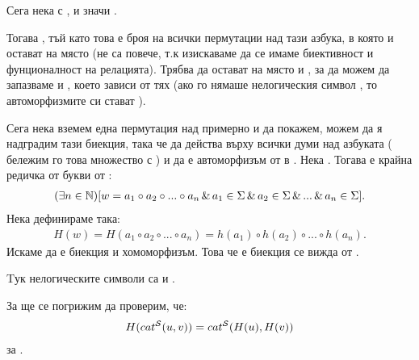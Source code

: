 \documentclass[12pt]{article}
\begin{document}
Сега нека с ,  и значи .

Тогава , тъй като това е броя на всички пермутации над тази азбука, в която  и  остават на място (не са повече, т.к изискаваме да се имаме биективност и фунционалност на релацията). Трябва да остават на място  и , за да можем да запазваме и , което зависи от тях (ако го нямаше нелогическия символ , то автоморфизмите си стават ).


Сега нека вземем една пермутация над \me{\Sigma} примерно  и да покажем, можем да я надградим тази биекция, така че да действа върху всички думи над азбуката \me{\Sigma} ( бележим го това множество с \me{\Sigma^*}) и да е автоморфизъм от \me{\Sigma^*} в \me{\Sigma^*}.\nl
\indent Нека . Тогава  е крайна редичка от букви от \me{\Sigma}:
\begin{gather*}
    (\exists n \in \mathbb{N})[w = a_1 \circ a_2 \circ ... \circ a_n \,\&\, a_1 \in \Sigma \,\&\, a_2 \in \Sigma \,\&\, ... \,\&\, a_n \in \Sigma].
\end{gather*}
Нека дефинираме  така:
\begin{gather*}
    H(w)= H(a_1 \circ a_2 \circ ... \circ a_n) = h(a_1) \circ h(a_2) \circ ... \circ h(a_n).
\end{gather*}
Искаме  да е биекция и хомоморфизъм.
Това че  е биекция се вижда от .

Tук нелогическите символи са  и .

За  ще се погрижим да проверим, че:
\begin{gather*}
    H(cat^{\mathcal{S}}(u, v)) = cat^{\mathcal{S}}(H(u), H(v))
\end{gather*}
за .
\end{document}

